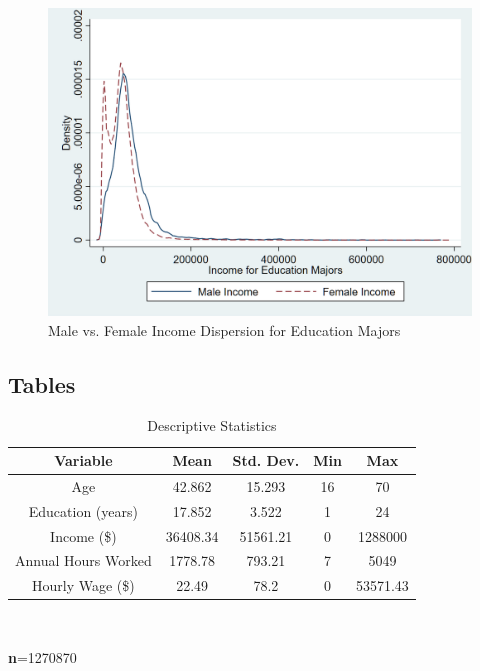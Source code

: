 \documentclass[12pt]{article}
\begin{document}
\begin{figure}[H]
\centering
\caption{Male vs. Female Income Dispersion for Education Majors}
\includegraphics[scale=0.27]{education.png}
\end{figure}

\subsection{Tables}
\begin{center}
\begin{table}[H]
\centering
\caption{Descriptive Statistics}
\begin{tabular}{|c | c c c c|}
\hline
\textbf{Variable} & \textbf{Mean} & \textbf{Std. Dev.} & \textbf{Min} & \textbf{Max} \\
\hline
Age &   42.862   &  15.293     &    16    &     70\\
Education (years) &   17.852  &  3.522   &       1  &       24 \\
Income (\$) &    36408.34  &  51561.21  &   0  &  1288000 \\
Annual Hours Worked &  1778.78  &  793.21     &    7    &   5049 \\
Hourly Wage (\$)   &  22.49  &  78.2   &       0  & 53571.43 \\
\hline
\end{tabular} \\
\begin{flushleft}
\footnotesize \textbf{n}=1270870
\end{flushleft}
\end{table}
\end{center}
\end{document}
